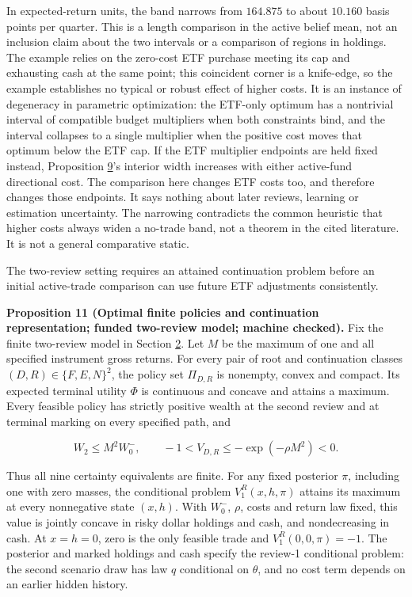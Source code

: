 \documentclass[11pt]{article}
\begin{document}
In expected-return units, the band narrows from \(164.875\) to about
\(10.160\) basis points per quarter. This is a length comparison in
the active belief mean, not an inclusion claim about the two
intervals or a comparison of regions in holdings. The example
relies on the zero-cost ETF purchase meeting its cap and exhausting
cash at the same point; this coincident corner is a knife-edge, so the
example establishes no typical or robust effect of higher costs.
It is an instance of degeneracy in parametric optimization: the
ETF-only optimum has a nontrivial interval of compatible budget
multipliers when both constraints bind, and the interval collapses
to a single multiplier when the positive cost moves that optimum
below the ETF cap. If the ETF multiplier endpoints are held fixed
instead, Proposition \hyperref[res:Proposition-9]{9}'s interior width increases with either
active-fund directional cost. The comparison here changes ETF costs
too, and therefore changes those endpoints. It says nothing about
later reviews, learning or estimation uncertainty. The narrowing
contradicts the common heuristic that higher costs always widen a
no-trade band, not a theorem in the cited literature. It is not a
general comparative static.

The two-review setting requires an attained continuation problem
before an initial active-trade comparison can use future ETF
adjustments consistently.

\label{res:Proposition-11}
\textbf{Proposition 11 (Optimal finite policies and continuation representation; funded two-review model; machine checked).}
Fix the finite two-review model in Section \hyperref[sec:2]{2}. Let \(M\) be the
maximum of one and all specified instrument gross returns. For
every pair of root and continuation classes
\((D,R)\in\{F,E,N\}^2\), the policy set \(\Pi_{D,R}\) is nonempty,
convex and compact. Its expected terminal utility \(\Phi\) is
continuous and concave and attains a maximum. Every feasible
policy has strictly positive wealth at the second review and at
terminal marking on every specified path, and

\begin{equation*}
W_2\leq M^2W_0^-,
\qquad
-1<V_{D,R}\leq-\exp(-\rho M^2)<0.
\tag{26}\label{eq:26}
\end{equation*}

Thus all nine certainty equivalents are finite. For any fixed
posterior \(\pi\), including one with zero masses, the conditional
problem \(V_1^R(x,h,\pi)\) attains its maximum at every nonnegative
state \((x,h)\). With \(W_0^-\), \(\rho\), costs and return law fixed,
this value is jointly concave in risky dollar holdings and cash,
and nondecreasing in cash. At \(x=h=0\), zero is the only feasible
trade and \(V_1^R(0,0,\pi)=-1\). The posterior and marked holdings
and cash specify the review-1 conditional problem: the second
scenario draw has law \(q\) conditional on \(\theta\), and no cost
term depends on an earlier hidden history.
\end{document}
